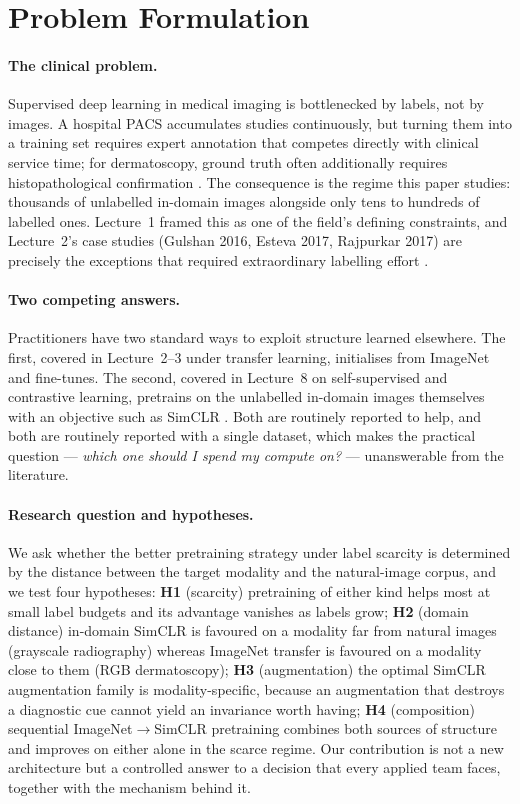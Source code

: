 \documentclass{article}
\begin{document}
\section{Problem Formulation}

\paragraph{The clinical problem.} Supervised deep learning in medical imaging is
bottlenecked by labels, not by images. A hospital PACS accumulates studies continuously,
but turning them into a training set requires expert annotation that competes directly
with clinical service time; for dermatoscopy, ground truth often additionally requires
histopathological confirmation \citep{tschandl2018ham10000}. The consequence is the
regime this paper studies: thousands of unlabelled in-domain images alongside only tens
to hundreds of labelled ones. Lecture~1 framed this as one of the field's defining
constraints, and Lecture~2's case studies (Gulshan 2016, Esteva 2017, Rajpurkar 2017)
are precisely the exceptions that required extraordinary labelling effort
\citep{esteva2017dermatologist,rajpurkar2017chexnet}.

\paragraph{Two competing answers.} Practitioners have two standard ways to exploit
structure learned elsewhere. The first, covered in Lecture~2--3 under transfer learning,
initialises from ImageNet \citep{deng2009imagenet,he2016resnet} and fine-tunes. The
second, covered in Lecture~8 on self-supervised and contrastive learning, pretrains on
the unlabelled in-domain images themselves with an objective such as SimCLR
\citep{chen2020simclr}. Both are routinely reported to help, and both are routinely
reported with a single dataset, which makes the practical question --- \emph{which one
should I spend my compute on?} --- unanswerable from the literature.

\paragraph{Research question and hypotheses.} We ask whether the better pretraining
strategy under label scarcity is determined by the distance between the target modality
and the natural-image corpus, and we test four hypotheses:
\textbf{H1} (scarcity) pretraining of either kind helps most at small label budgets and
its advantage vanishes as labels grow;
\textbf{H2} (domain distance) in-domain SimCLR is favoured on a modality far from natural
images (grayscale radiography) whereas ImageNet transfer is favoured on a modality close
to them (RGB dermatoscopy);
\textbf{H3} (augmentation) the optimal SimCLR augmentation family is modality-specific,
because an augmentation that destroys a diagnostic cue cannot yield an invariance worth
having;
\textbf{H4} (composition) sequential ImageNet$\rightarrow$SimCLR pretraining combines
both sources of structure and improves on either alone in the scarce regime.
Our contribution is not a new architecture but a controlled answer to a decision that
every applied team faces, together with the mechanism behind it.
\end{document}
